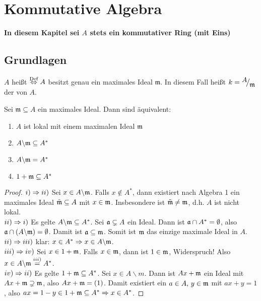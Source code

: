 \newpage
\section{Kommutative Algebra}
\begin{center}
	\textbf{In diesem Kapitel sei $A$ stets ein kommutativer Ring (mit Eins)}
\end{center}
\setcounter{subsection}{10}
\subsection{Grundlagen}
\begin{df}\label{11.1}
	$A$ heißt  $\overset{\text{Def}}{\Leftrightarrow} A$ besitzt genau ein maximales Ideal $\mathfrak{m}$. In diesem Fall heißt $k= \QR{A}{\mathfrak{m}}$ der  von $A$.
\end{df}
\begin{bem}\label{11.2}
	Sei $\mathfrak{m}\subseteq A$ ein maximales Ideal. Dann sind äquivalent:
	\begin{enumerate}[label= \roman*)]
		\item $A$ ist lokal mit einem maximalen Ideal $\mathfrak{m}$
		\item $A\backslash \mathfrak{m} \subseteq A^*$
		\item $A \backslash \mathfrak{m} = A^*$
		\item $1+ \mathfrak{m} \subseteq A^*$
	\end{enumerate}
\end{bem}
\begin{proof}
	$i) \Rightarrow ii)$ Sei $x\in A\backslash \mathfrak{m}$. Falls $x\notin A^*$, dann existiert nach Algebra 1 ein maximales Ideal $\tilde{\mathfrak{m}} \subseteq A$ mit $x\in \mathfrak{m}$. Insbesondere ist $\tilde{\mathfrak{m}} \neq \mathfrak{m}$, d.h. $A$ ist nicht lokal.\\
	$ii) \Rightarrow i)$ Es gelte $A\backslash \mathfrak{m} \subseteq A^*$. Sei $\mathfrak{a}\subsetneq A$ ein Ideal. Dann ist $\mathfrak{a} \cap A^*= \emptyset$, also $\mathfrak{a} \cap (A\backslash \mathfrak{m}) = \emptyset$. Damit ist $\mathfrak{a} \subseteq \mathfrak{m}$. Somit ist $\mathfrak{m}$ das einzige maximale Ideal in $A$.\\
	$ii) \Rightarrow iii)$ klar: $x\in A^* \Rightarrow x\in A \backslash \mathfrak{m}$.\\
	$iii) \Rightarrow iv)$ Sei $x\in 1+ \mathfrak{m}$. Falls $x\in \mathfrak{m}$, dann ist $1\in \mathfrak{m}$, Widerspruch! Also $x\in A \backslash \mathfrak{m} \overset{iii)}{=} A^*$.\\
	$iv) \Rightarrow ii)$ Es gelte $1+ \mathfrak{m} \subseteq A^*$. Sei $x\in A \backslash m$. Dann ist $Ax+ \mathfrak{m}$ ein Ideal mit $Ax+ \mathfrak{m} \supsetneq \mathfrak{m}$, also $Ax+ \mathfrak{m} =(1)$. Damit existiert ein $a\in A, \, y\in \mathfrak{m}$ mit $ax+y =1$, also $ax=1-y\in 1+ \mathfrak{m} \subseteq A^* \Rightarrow x\in A^*$.
\end{proof}

